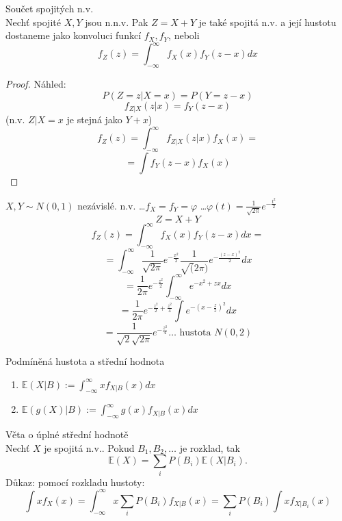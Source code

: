 \documentclass[../main.tex]{subfiles}
\begin{document}
\begin{theorem}
    Součet spojitých n.v.\\

    Nechť spojité $X,Y$ jsou n.n.v. Pak $Z = X+Y$ je také spojitá n.v. a její hustotu dostaneme jako konvoluci funkcí $f_X,f_Y$, neboli
    \[f_Z(z) = \int^\infty_{-\infty}f_X(x)f_Y(z-x)dx\]
\end{theorem}
\begin{proof}
    Náhled: \[P(Z=z | X=x) = P(Y = z-x)\]
    \[f_{Z|X}(z|x) = f_Y(z-x)\]
    (n.v. $Z|X=x$ je stejná jako $Y+x$)
    \[f_Z(z) = \int^\infty_{-\infty} f_{Z|X} (z|x)f_X(x) =\]
    \[=\int f_Y(z-x)f_X(x)\]
\end{proof}

\begin{example}
    $X,Y \sim N(0,1)$ nezávislé. n.v. \dots $f_X = f_Y = \varphi$ \dots $\varphi(t) = \frac{1}{\sqrt{2\pi}}e^{-\frac{t^2}{2}}$
    \[Z = X+Y\]
    \[f_Z(z) = \int^\infty_{-\infty} f_X(x)f_Y(z-x)dx=\]
    \[= \int^\infty_{-\infty} \frac{1}{\sqrt{2\pi}} e^{-\frac{x^2}{2}} \frac{1}{\sqrt(2\pi)}e^{-\frac{(z-x)^2}{2}}dx\]
    \[= \frac{1}{2\pi} e^{-\frac{z^2}{2}}\int^\infty_{-\infty}e^{-x^2 + zx}dx\]
    \[= \frac{1}{2\pi} e^{-\frac{z^2}{2}+\frac{z^2}{4}} \int e^{-(x-\frac{z}{2})^2}dx\]
    \[= \frac{1}{\sqrt{2}\sqrt{2\pi}} e^{-\frac{z^2}{4}} \dots \text{ hustota } N(0,2) \]
\end{example}

\begin{definition}
    Podmíněná hustota a střední hodnota\\

    \begin{enumerate}
        \item $\mathbb{E}(X|B) := \int^\infty_{-\infty} xf_{X|B}(x)dx$
        \item $\mathbb{E}(g(X)|B):=\int^\infty_{-\infty}g(x)f_{X|B}(x)dx$
    \end{enumerate}
\end{definition}
\begin{theorem}
    Věta o úplné střední hodnotě\\

    Nechť $X$ je spojitá n.v.. Pokud $B_1,B_2,\dots$ je rozklad, tak
    \[\mathbb{E}(X) = \sum_i P(B_i)\mathbb{E}(X|B_i).\]
    Důkaz: pomocí rozkladu hustoty:
    \[\int xf_X(x) = \int^\infty_{-\infty} x\sum_i P(B_i) f_{X|B}(x) = \sum_i P(B_i) \int x f_{X|B_i} (x)\]
\end{theorem}
\end{document}
